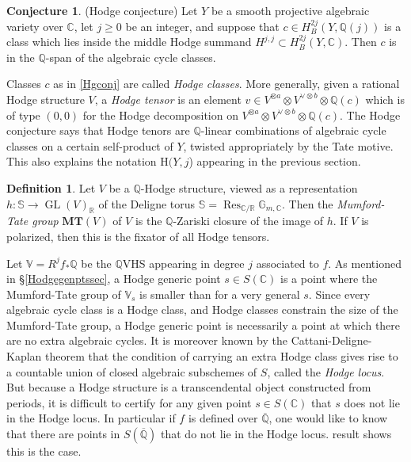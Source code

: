 \documentclass[10pt]{article}
\numberwithin{equation}{section}
\theoremstyle{plain}
\theoremstyle{definition}
\newtheorem{defn}[thm]{Definition}
\newtheorem{conj}[thm]{Conjecture}
\theoremstyle{remark}
\newcommand{\MT}{\mathbf{MT}}
\newcommand{\GL}{\operatorname{GL}}
\newcommand{\Qbar}{\overline{\mathbb{Q}}}
\newcommand{\Q}{\mathbb{Q}}
\newcommand{\V}{\mathbb{V}}
\begin{document}
\begin{conj}(Hodge conjecture)
\label{Hgconj}
Let $Y$ be a smooth projective algebraic variety over $\mathbb{C}$, let $j \geq 0$ be an integer, and suppose that $c \in H^{2j}_{B}(Y, \mathbb{Q}(j))$ is a class which lies inside the middle Hodge summand $H^{j,j} \subset H^{2j}_{B}(Y, \mathbb{C})$. Then $c$ is in the $\mathbb{Q}$-span of the algebraic cycle classes.
\end{conj}

\noindent Classes $c$ as in \autoref{Hgconj} are called \emph{Hodge classes}. More generally, given a rational Hodge structure $V$, a \emph{Hodge tensor} is an element $v \in V^{\otimes a }\otimes V^{\vee \otimes b} \otimes \Q(c)$ which is of type $(0,0)$ for the Hodge decomposition on $V^{\otimes a }\otimes V^{\vee \otimes b} \otimes \Q(c)$. The Hodge conjecture says that Hodge tenors are $\mathbb{Q}$-linear combinations of algebraic cycle classes on a certain self-product of $Y$, twisted appropriately by the Tate motive. This also explains the notation $\mathrm{H}(Y,j$) appearing in the previous section. 

\begin{defn}
\label{MTdef}
Let $V$ be a $\mathbb{Q}$-Hodge structure, viewed as a representation $h : \mathbb{S} \to \GL(V)_{\mathbb{R}}$ of the Deligne torus $\mathbb{S} = \operatorname{Res}_{\mathbb{C}/\mathbb{R}} \mathbb{G}_{m,\mathbb{C}}$. Then the \emph{Mumford-Tate group} $\MT(V)$ of $V$ is the $\mathbb{Q}$-Zariski closure of the image of $h$. If $V$ is polarized, then this is the fixator of all Hodge tensors.
\end{defn}


Let $\V = R^{j} f_{*} \mathbb{Q}$ be the $\mathbb{Q}$VHS appearing in degree $j$ associated to $f$. As mentioned in \S\ref{Hodgegenptssec}, a Hodge generic point $s \in S(\mathbb{C})$ is a point where the Mumford-Tate group of $\mathbb{V}_{s}$ is smaller than for a very general $s$. Since every algebraic cycle class is a Hodge class, and Hodge classes constrain the size of the Mumford-Tate group, a Hodge generic point is necessarily a point at which there are no extra algebraic cycles. It is moreover known by the Cattani-Deligne-Kaplan theorem \cite{CDK} that the condition of carrying an extra Hodge class gives rise to a countable union of closed algebraic subschemes of $S$, called the \emph{Hodge locus}. But because a Hodge structure is a transcendental object constructed from periods, it is difficult to certify for any given point $s \in S(\mathbb{C})$ that $s$ does not lie in the Hodge locus. In particular if $f$ is defined over $\Qbar$, one would like to know that there are points in $S(\Qbar)$ that do not lie in the Hodge locus.  result shows this is the case.
\end{document}
